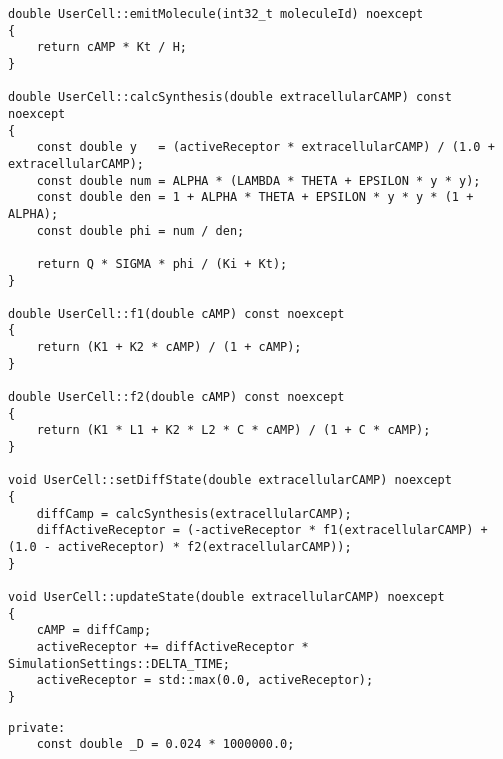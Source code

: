 \documentclass[vipdfmx,a4paper,11pt]{jsarticle}
\begin{document}
\begin{lstlisting}[caption=class UserCell(UserCell.cpp)]
double UserCell::emitMolecule(int32_t moleculeId) noexcept
{
    return cAMP * Kt / H;
}

double UserCell::calcSynthesis(double extracellularCAMP) const noexcept
{
    const double y   = (activeReceptor * extracellularCAMP) / (1.0 + extracellularCAMP);
    const double num = ALPHA * (LAMBDA * THETA + EPSILON * y * y);
    const double den = 1 + ALPHA * THETA + EPSILON * y * y * (1 + ALPHA);
    const double phi = num / den;

    return Q * SIGMA * phi / (Ki + Kt);
}

double UserCell::f1(double cAMP) const noexcept
{
    return (K1 + K2 * cAMP) / (1 + cAMP);
}

double UserCell::f2(double cAMP) const noexcept
{
    return (K1 * L1 + K2 * L2 * C * cAMP) / (1 + C * cAMP);
}

void UserCell::setDiffState(double extracellularCAMP) noexcept
{
    diffCamp = calcSynthesis(extracellularCAMP);
    diffActiveReceptor = (-activeReceptor * f1(extracellularCAMP) + (1.0 - activeReceptor) * f2(extracellularCAMP));
}

void UserCell::updateState(double extracellularCAMP) noexcept
{
    cAMP = diffCamp;
    activeReceptor += diffActiveReceptor * SimulationSettings::DELTA_TIME;
    activeReceptor = std::max(0.0, activeReceptor);
}
\end{lstlisting}

\begin{lstlisting}[caption=class UserMoleculeSpace(UserMoleculeSpace.hpp)]
private:
    const double _D = 0.024 * 1000000.0;
\end{lstlisting}
\end{document}
